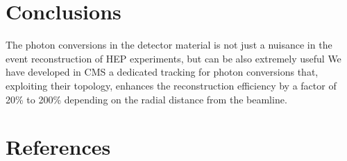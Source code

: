 \documentclass[a4paper]{jpconf}
\begin{document}
\section{Conclusions}
\label{section_conclusions}

The photon conversions in the detector material is not just a nuisance in the event reconstruction of HEP experiments, but can be also extremely useful 
We have developed in CMS	a dedicated tracking for photon  conversions that,
exploiting their topology, enhances the reconstruction efficiency by a factor of 20\% to 200\% depending on the radial distance from the beamline.

\section*{References}
%



{}

%
%
\end{document}

